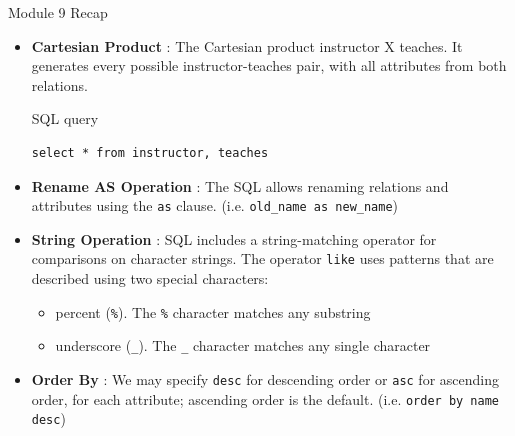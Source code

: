 \documentclass[aspectratio=169, xcolor=dvipsnames]{beamer}
\begin{document}
\begin{frame}[fragile]{Module 9 Recap}
    \begin{itemize}[<+->]
        \item \textbf{Cartesian Product} : The Cartesian product instructor X teaches. It generates every possible instructor-teaches pair, with all attributes from both relations. 
        \begin{exampleblock}{SQL query}
            \begin{verbatim}select * from instructor, teaches\end{verbatim}
        \end{exampleblock}
        \item \textbf{Rename AS Operation} : The SQL allows renaming relations and attributes using the \texttt{as} clause. (i.e. \texttt{old\_name as new\_name})
        \item \textbf{String Operation} : SQL includes a string-matching operator for comparisons on character strings. The operator \texttt{like} uses patterns that are described using two special characters:
        \begin{itemize}
            \item[$\triangleright$] percent (\texttt{\%}). The \texttt{\%} character matches any substring
            \item[$\triangleright$] underscore (\texttt{\_}). The \texttt{\_} character matches any single character
        \end{itemize}
        \item \textbf{Order By} : We may specify \texttt{desc} for descending order or \texttt{asc} for ascending order, for each attribute; ascending order is the default. (i.e. \texttt{order by name desc})
    \end{itemize}
\end{frame}
\end{document}
